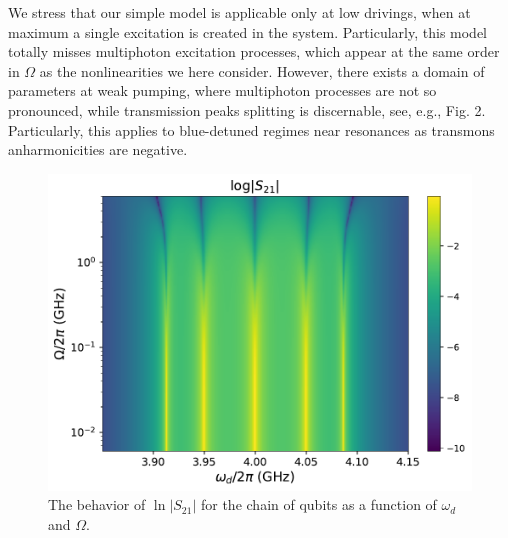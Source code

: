 \documentclass[%
 aps, pra,
 amsmath,amssymb,
 preprint,%
superscriptaddress
]{revtex4-2}
\begin{document}
We stress that our simple model is applicable only at low drivings, when at maximum a single excitation is created in the system. Particularly, this model totally misses multiphoton excitation processes, which appear at the same order in $\Omega$ as the nonlinearities we here consider. However, there exists a domain of parameters at weak pumping, where multiphoton processes are not so pronounced, while transmission peaks splitting is discernable, see, e.g., Fig. 2. Particularly, this applies to blue-detuned regimes near resonances as transmons anharmonicities are negative.

\begin{figure}[h!]
\includegraphics[width=.5\linewidth]{map-s21-5qb2-w-log.pdf}
	\caption{The behavior of $\ln |S_{21}|$ for the chain of qubits as
		a function of $\omega_d$ and $\Omega$.}
	\label{fig:qubitchain}
\end{figure}

	
\end{document}
